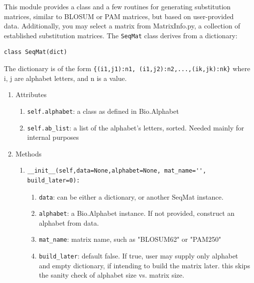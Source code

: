 \documentclass{report}
\begin{document}
This module provides a class and a few routines for generating substitution matrices, similar to BLOSUM or PAM matrices, but based on user-provided data. Additionally, you may select a matrix from MatrixInfo.py, a collection of established substitution matrices. The \verb+SeqMat+ class derives from a dictionary:
\begin{verbatim}
class SeqMat(dict)
\end{verbatim}
The dictionary is of the form \verb|{(i1,j1):n1, (i1,j2):n2,...,(ik,jk):nk}| where i, j are alphabet letters, and n is a value.

\begin{enumerate}
  \item Attributes
  \begin{enumerate}
    \item \verb|self.alphabet|: a class as defined in Bio.Alphabet

    \item \verb|self.ab_list|: a list of the alphabet's letters, sorted. Needed mainly for internal purposes
  \end{enumerate}

  \item Methods

  \begin{enumerate}

    \item
\begin{verbatim}
__init__(self,data=None,alphabet=None, mat_name='', build_later=0):
\end{verbatim}

    \begin{enumerate}

      \item \verb|data|: can be either a dictionary, or another SeqMat instance.
      \item \verb|alphabet|: a Bio.Alphabet instance. If not provided, construct an alphabet from data.

      \item \verb|mat_name|: matrix name, such as "BLOSUM62" or "PAM250"

      \item \verb|build_later|: default false. If true, user may supply only alphabet and empty dictionary, if intending to build the matrix later. this skips the sanity check of alphabet size vs. matrix size.

    \end{enumerate}


\end{enumerate}
\end{enumerate}
\end{document}
